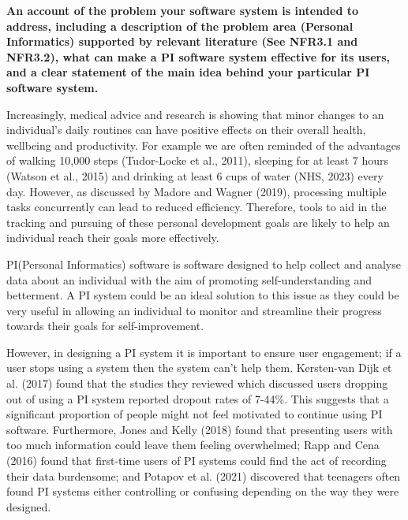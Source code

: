 \documentclass[12pt]{article}
\begin{document}
\textbf{An account of the problem your software system is intended to address, including a
description of the problem area (Personal Informatics) supported by relevant literature (See
NFR3.1 and NFR3.2), what can make a PI software system effective for its users, and a clear
statement of the main idea behind your particular PI software system.}

Increasingly, medical advice and research is showing that minor changes to an individual’s daily routines can have positive effects on their overall health, wellbeing and productivity. For example we are often reminded of the advantages of walking 10,000 steps (Tudor-Locke et al., 2011), sleeping for at least 7 hours (Watson et al., 2015) and drinking at least 6 cups of water (NHS, 2023) every day. However, as discussed by Madore and Wagner (2019), processing multiple tasks concurrently can lead to reduced efficiency. Therefore, tools to aid in the tracking and pursuing of these personal development goals are likely to help an individual reach their goals more effectively.\par

PI(Personal Informatics) software is software designed to help collect and analyse data about an individual with the aim of promoting self-understanding and betterment. A PI system could be an ideal solution to this issue as they could be very useful in allowing an individual to monitor and streamline their progress towards their goals for self-improvement.\par

However, in designing a PI system it is important to ensure user engagement; if a user stops using a system then the system can’t help them. Kersten-van Dijk et al. (2017) found that the studies they reviewed which discussed users dropping out of using a PI system reported dropout rates of 7-44\%. This suggests that a significant proportion of people might not feel motivated to continue using PI software. Furthermore, Jones and Kelly (2018) found that presenting users with too much information could leave them feeling overwhelmed; Rapp and Cena (2016) found that first-time users of PI systems could find the act of recording their data burdensome; and Potapov et al. (2021) discovered that teenagers often found PI systems either controlling or confusing depending on the way they were designed.\par
\end{document}
